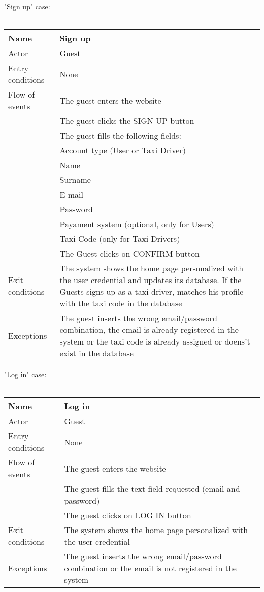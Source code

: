 \newpage
"Sign up" case:
\\
\\
\begin{tabular}{|l|p{10cm}|} 
\hline
Name & Sign up\\
\hline
Actor & Guest\\
\hline
Entry conditions & None\\
\hline
Flow of events
			&	\tabitem The guest enters the website\\
			&	\tabitem The guest clicks the SIGN UP button\\
			&	\tabitem The guest fills the following fields:\\
			&	\tabtratt Account type $($User or Taxi Driver$)$\\
			&	\tabtratt Name\\
			&	\tabtratt Surname\\
			&	\tabtratt E-mail\\
			&	\tabtratt Password\\
			&	\tabtratt Payament system $($optional, only for Users$)$\\
			&	\tabtratt Taxi Code $($only for Taxi Drivers$)$\\
			&	\tabitem The Guest clicks on CONFIRM button\\
\hline
Exit conditions & The system shows the home page personalized with the user credential and updates its database. If the Guests signs up as a taxi driver, matches his profile with the taxi code in the database\\
\hline
Exceptions & The guest inserts the wrong email/password combination, the email is already registered in the system or the taxi code is already assigned or doens't exist in the database\\
\hline
\end {tabular}



\newpage
"Log in" case:
\\
\\
\begin{tabular}{|l|p{10cm}|} 
\hline
Name & Log in\\
\hline
Actor & Guest\\
\hline
Entry conditions & None\\
\hline
Flow of events
			&	\tabitem The guest enters the website\\
			&	\tabitem The guest fills the text field requested $($email and password$)$\\
			&	\tabitem The guest clicks on LOG IN button\\
\hline
Exit conditions & The system shows the home page personalized with the user credential\\
\hline
Exceptions & The guest inserts the wrong email/password combination or the email is not registered in the system\\
\hline
\end {tabular}


